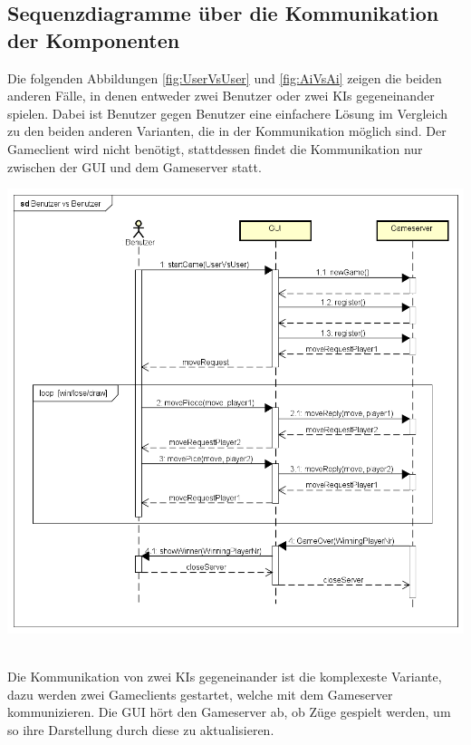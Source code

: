 \documentclass[12pt,a4paper,bibliography=totocnumbered,listof=totocnumbered]{article}
\begin{document}
\begin{appendix}
\section{Sequenzdiagramme über die Kommunikation der Komponenten}
\label{apx:KommunikationDerKomp}
Die folgenden Abbildungen \ref{fig:UserVsUser} und \ref{fig:AiVsAi} zeigen die beiden anderen Fälle, in 
denen entweder zwei Benutzer oder zwei KIs gegeneinander spielen. Dabei ist Benutzer gegen Benutzer eine einfachere Lösung im Vergleich zu den beiden anderen Varianten, die 
in der Kommunikation möglich sind. Der Gameclient wird nicht benötigt, stattdessen findet die Kommunikation nur zwischen der \ac{GUI} und dem Gameserver statt.

\vspace{1em}
\begin{minipage}{\linewidth}
	\centering
	\includegraphics[width=1.0\linewidth]{pics/SequenceDiagramBenutzervsBenutzer.png}
    \label{fig:UserVsUser}
\end{minipage}
\\

Die Kommunikation von zwei KIs gegeneinander ist die komplexeste Variante, dazu werden zwei Gameclients gestartet, welche mit dem Gameserver 
kommunizieren. Die \ac{GUI} hört den Gameserver ab, ob Züge gespielt werden, um so ihre Darstellung durch diese zu aktualisieren.


\end{appendix}
\end{document}
